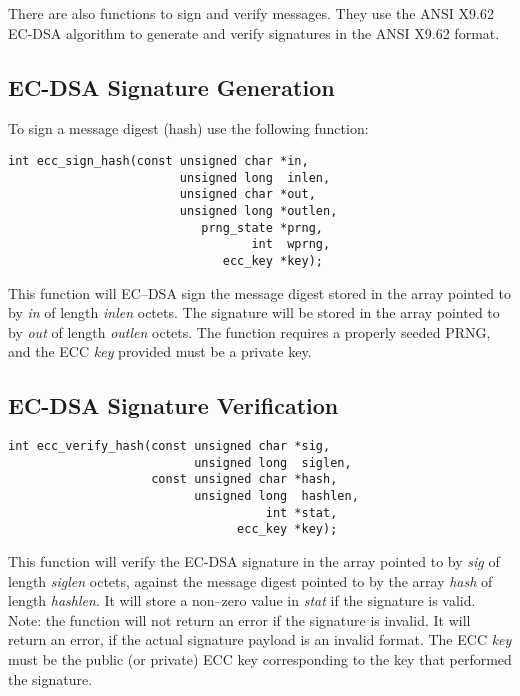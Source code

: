 \documentclass[synpaper]{book}
\begin{document}
There are also functions to sign and verify messages.  They use the ANSI X9.62 EC-DSA algorithm to generate and verify signatures in the
ANSI X9.62 format.  

\subsection{EC-DSA Signature Generation}
To sign a message digest (hash) use the following function:

\begin{verbatim}
int ecc_sign_hash(const unsigned char *in,  
                        unsigned long  inlen,
                        unsigned char *out, 
                        unsigned long *outlen,
                           prng_state *prng, 
                                  int  wprng, 
                              ecc_key *key);
\end{verbatim}

This function will EC--DSA sign the message digest stored in the array pointed to by \textit{in} of length \textit{inlen} octets.  The signature
will be stored in the array pointed to by \textit{out} of length \textit{outlen} octets.  The function requires a properly seeded PRNG, and 
the ECC \textit{key} provided must be a private key.

\subsection{EC-DSA Signature Verification}
\begin{verbatim}
int ecc_verify_hash(const unsigned char *sig, 
                          unsigned long  siglen,
                    const unsigned char *hash, 
                          unsigned long  hashlen, 
                                    int *stat, 
                                ecc_key *key);
\end{verbatim}

This function will verify the EC-DSA signature in the array pointed to by \textit{sig} of length \textit{siglen} octets, against the message digest 
pointed to by the array \textit{hash} of length \textit{hashlen}.  It will store a non--zero value in \textit{stat} if the signature is valid.  Note: 
the function will not return an error if the signature is invalid.  It will return an error, if the actual signature payload is an invalid format.  
The ECC \textit{key} must be the public (or private) ECC key corresponding to the key that performed the signature.
\end{document}
